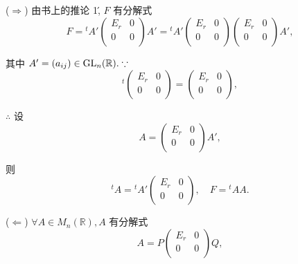 \documentclass[color=black,device=normal,lang=cn,mode=geye]{elegantnote}
\begin{document}
\begin{solution}
    ($\Rightarrow$) 由书上的推论 1\', $F$ 有分解式
    \[F={}^tA'\begin{pmatrix}
        E_r & 0 \\
        0 & 0 \\
    \end{pmatrix}A'={}^tA'\begin{pmatrix}
        E_r & 0 \\
        0 & 0 \\
    \end{pmatrix}\begin{pmatrix}
        E_r & 0 \\
        0 & 0 \\
    \end{pmatrix}A',\]

    其中 $A'=(a_{ij})\in\operatorname{GL} _n(\mathbb{R}).\because$
    \[{}^t\begin{pmatrix}
        E_r & 0 \\
        0 & 0 \\
    \end{pmatrix}=\begin{pmatrix}
        E_r & 0 \\
        0 & 0 \\
    \end{pmatrix},\]

    $\therefore$ 设
    \[A=\begin{pmatrix}
        E_r & 0 \\
        0 & 0 \\
    \end{pmatrix}A',\]

    则
    \[{}^tA={}^tA'\begin{pmatrix}
        E_r & 0 \\
        0 & 0 \\
    \end{pmatrix},\quad F={}^tAA.\]

    ($\Leftarrow$) $\forall A\in M_n(\mathbb{R}),A$ 有分解式
    \[A=P\begin{pmatrix}
        E_r & 0 \\
        0 & 0 \\
    \end{pmatrix}Q,\]


\end{solution}
\end{document}
